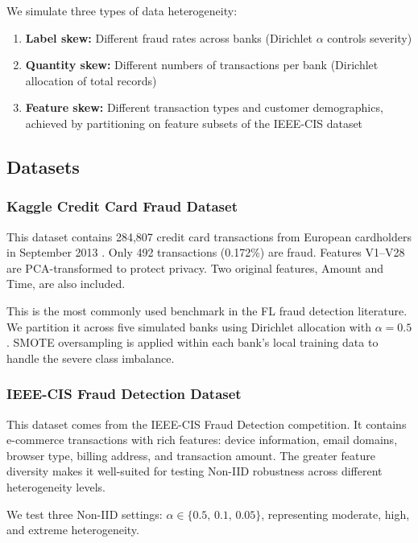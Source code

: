 \documentclass[12pt, a4paper]{article}
\begin{document}
We simulate three types of data heterogeneity:
\begin{enumerate}[leftmargin=*, label=\arabic*.]
\item \textbf{Label skew:} Different fraud rates across banks (Dirichlet $\alpha$ controls severity)
\item \textbf{Quantity skew:} Different numbers of transactions per bank (Dirichlet allocation of total records)
\item \textbf{Feature skew:} Different transaction types and customer demographics, achieved by partitioning on feature subsets of the IEEE-CIS dataset
\end{enumerate}

\subsection{Datasets}

\subsubsection{Kaggle Credit Card Fraud Dataset}

This dataset contains 284,807 credit card transactions from European cardholders in September 2013 \citep{dal2015calibrating}. Only 492 transactions (0.172\%) are fraud. Features V1--V28 are PCA-transformed to protect privacy. Two original features, Amount and Time, are also included.

This is the most commonly used benchmark in the FL fraud detection literature. We partition it across five simulated banks using Dirichlet allocation with $\alpha = 0.5$. SMOTE oversampling is applied within each bank's local training data to handle the severe class imbalance.

\subsubsection{IEEE-CIS Fraud Detection Dataset}

This dataset comes from the IEEE-CIS Fraud Detection competition. It contains e-commerce transactions with rich features: device information, email domains, browser type, billing address, and transaction amount. The greater feature diversity makes it well-suited for testing Non-IID robustness across different heterogeneity levels.

We test three Non-IID settings: $\alpha \in \{0.5,\, 0.1,\, 0.05\}$, representing moderate, high, and extreme heterogeneity.
\end{document}

